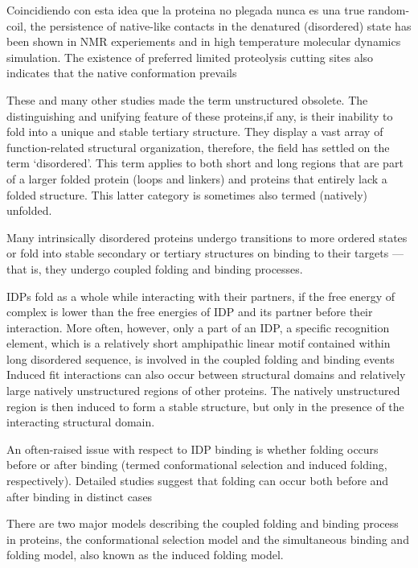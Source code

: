 Coincidiendo con esta idea que la proteina no plegada nunca es una true random-coil, the persistence of native-like contacts in the denatured (disordered) state has been shown in NMR experiements and in high temperature molecular dynamics simulation. The existence of preferred limited proteolysis cutting sites also indicates that the native conformation prevails

These and many other studies made the term unstructured obsolete. 
The distinguishing and unifying feature of these proteins,if any, is their inability to fold into a unique and stable tertiary structure.
They display a vast array of function-related structural organization, therefore, the field has settled on the term ‘disordered’. 
This term applies to both short and long regions that are part of a larger folded protein (loops and linkers) and proteins that entirely lack a folded structure. 
This latter category is sometimes also termed (natively) unfolded. 




Many intrinsically disordered proteins undergo transitions to more ordered states or fold into stable secondary or tertiary structures on binding to their targets — that is, they undergo coupled folding and binding processes.

IDPs fold as a whole while interacting with their partners, if the free energy of complex is lower than the free energies of IDP and its partner before their interaction.
More often, however, only a part of an IDP, a specific recognition element, which is a relatively short amphipathic linear motif contained within long disordered sequence, is involved in the coupled folding and binding events
Induced fit interactions can also occur between structural domains and relatively large natively unstructured regions of other proteins. 
The natively unstructured region is then induced to form a stable structure, but only in the presence of the interacting structural domain.

An often-raised issue with respect to IDP binding is whether folding occurs before or after binding (termed conformational selection and induced folding, respectively).
Detailed studies suggest that folding can occur both before and after binding in distinct cases


There are two major models describing the coupled folding and binding process in proteins, the conformational selection model and the simultaneous binding and folding model, also known as the induced folding model.








